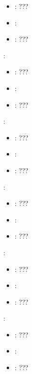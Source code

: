 \begin{itemize}
{\begin{itemize}
                \item \optionPossibleValues{}: ???
                \item \optionDefaultValue{}: 
                \item \optionDescrption{}: ???
           \end{itemize}
    \item {}:
           \begin{itemize}
                \item \optionPossibleValues{}: ???
                \item \optionDefaultValue{}: 
                \item \optionDescrption{}: ???
           \end{itemize}
    \item {}:
           \begin{itemize}
                \item \optionPossibleValues{}: ???
                \item \optionDefaultValue{}: 
                \item \optionDescrption{}: ???
           \end{itemize}
    \item {}:
           \begin{itemize}
                \item \optionPossibleValues{}: ???
                \item \optionDefaultValue{}: 
                \item \optionDescrption{}: ???
           \end{itemize}
    \item {}:
           \begin{itemize}
                \item \optionPossibleValues{}: ???
                \item \optionDefaultValue{}: 
                \item \optionDescrption{}: ???
           \end{itemize}
    \item {}:
           \begin{itemize}
                \item \optionPossibleValues{}: ???
                \item \optionDefaultValue{}: 
                \item \optionDescrption{}: ???
           \end{itemize}
    }
\end{itemize}
